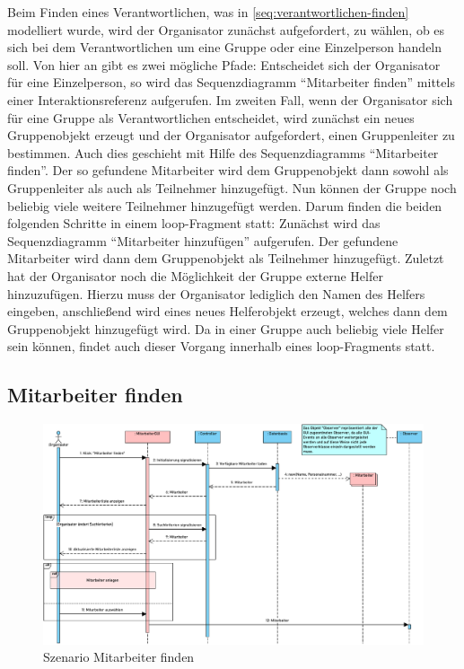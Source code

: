 Beim Finden eines Verantwortlichen, was in \autoref{seq:verantwortlichen-finden} modelliert wurde, wird der Organisator zunächst aufgefordert, zu wählen, ob es sich bei dem Verantwortlichen um eine Gruppe oder eine Einzelperson handeln soll. Von hier an gibt es zwei mögliche Pfade: Entscheidet sich der Organisator für eine Einzelperson, so wird das Sequenzdiagramm \enquote{Mitarbeiter finden} mittels einer Interaktionsreferenz aufgerufen. Im zweiten Fall, wenn der Organisator sich für eine Gruppe als Verantwortlichen entscheidet, wird zunächst ein neues Gruppenobjekt erzeugt und der Organisator aufgefordert, einen Gruppenleiter zu bestimmen. Auch dies geschieht mit Hilfe des Sequenzdiagramms \enquote{Mitarbeiter finden}. Der so gefundene Mitarbeiter wird dem Gruppenobjekt dann sowohl als Gruppenleiter als auch als Teilnehmer hinzugefügt. Nun können der Gruppe noch beliebig viele weitere Teilnehmer hinzugefügt werden. Darum finden die beiden folgenden Schritte in einem loop-Fragment statt: Zunächst wird das Sequenzdiagramm \enquote{Mitarbeiter hinzufügen} aufgerufen. Der gefundene Mitarbeiter wird dann dem Gruppenobjekt als Teilnehmer hinzugefügt. Zuletzt hat der Organisator noch die Möglichkeit der Gruppe externe Helfer hinzuzufügen. Hierzu muss der Organisator lediglich den Namen des Helfers eingeben, anschließend wird eines neues Helferobjekt erzeugt, welches dann dem Gruppenobjekt hinzugefügt wird. Da in einer Gruppe auch beliebig viele Helfer sein können, findet auch dieser Vorgang innerhalb eines loop-Fragments statt. 

\FloatBarrier

\subsection{Mitarbeiter finden}

\begin{figure}[ht!]
    \centering
    \includegraphics[width=0.98\columnwidth]{Bilder/seq_Mitarbeiter_finden.pdf}
    \caption{Szenario Mitarbeiter finden}
    \label{seq:mitarbeiter-finden}
\end{figure}

